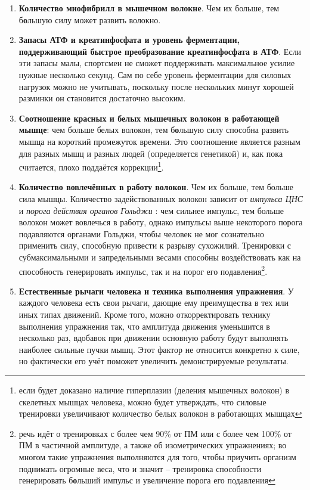 \documentclass[
]{article}
\begin{document}
\begin{enumerate}
\def\labelenumi{\arabic{enumi}.}
\item
  \textbf{Количество миофибрилл в мышечном волокне}. Чем их больше, тем
  б\textbf{о}льшую силу может развить волокно.
\item
  \textbf{Запасы АТФ и креатинфосфата и уровень ферментации,
  поддерживающий быстрое преобразование креатинфосфата в АТФ}. Если эти
  запасы малы, спортсмен не сможет поддерживать максимальное усилие
  нужные несколько секунд. Сам по себе уровень ферментации для силовых
  нагрузок можно не учитывать, поскольку после нескольких минут хорошей
  разминки он становится достаточно высоким.
\item
  \textbf{Соотношение красных и белых мышечных волокон в работающей
  мышце}: чем больше белых волокон, тем б\textbf{о}льшую силу способна
  развить мышца на короткий промежуток времени. Это соотношение является
  разным для разных мышц и разных людей (определяется генетикой) и, как
  пока считается, плохо поддаётся коррекции\footnote{если будет доказано
    наличие гиперплазии (деления мышечных волокон) в скелетных мышцах
    человека, можно будет утверждать, что силовые тренировки увеличивают
    количество белых волокон в работающих мышцах}.
\item
  \textbf{Количество вовлечённых в работу волокон}. Чем их больше, тем
  больше сила мышцы. Количество задействованных волокон зависит от
  \emph{импульса ЦНС} и \emph{порога действия органов Гольджи} : чем
  сильнее импульс, тем больше волокон может вовлечься в работу, однако
  импульсы выше некоторого порога подавляются органами Гольджи, чтобы
  человек не мог сознательно применить силу, способную привести к
  разрыву сухожилий. Тренировки с субмаксимальными и запредельными
  весами способны воздействовать как на способность генерировать
  импульс, так и на порог его подавления\footnote{речь идёт о
    тренировках с более чем 90\% от ПМ или с более чем 100\% от ПМ в
    частичной амплитуде, а также об изометрических упражнениях; во
    многом такие упражнения выполняются для того, чтобы приучить
    организм поднимать огромные веса, что и значит -- тренировка
    способности генерировать б\textbf{о}льший импульс и увеличение
    порога его подавления}.
\item
  \textbf{Естественные рычаги человека и техника выполнения упражнения}.
  У каждого человека есть свои рычаги, дающие ему преимущества в тех или
  иных типах движений. Кроме того, можно откорректировать технику
  выполнения упражнения так, что амплитуда движения уменьшится в
  несколько раз, вдобавок при движении основную работу будут выполнять
  наиболее сильные пучки мышц. Этот фактор не относится конкретно к
  силе, но фактически его учёт поможет увеличить демонстрируемые
  результаты.
\end{enumerate}
\end{document}
